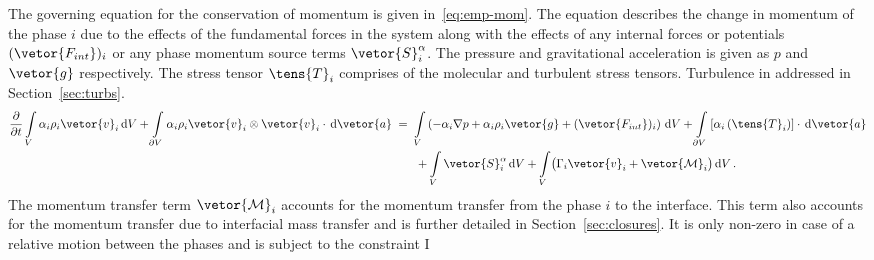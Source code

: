The governing equation for the conservation of momentum is given in~\eqref{eq:emp-mom}.
 The equation describes the change in momentum of the phase $i$ due to the effects of the
 fundamental forces in the system along with the effects of any internal forces or potentials $(\vetor{F_{int}})_{i}$
 or any phase momentum source terms $\vetor{S}_{i}^{\alpha}$. The pressure and gravitational acceleration is given as $p$ and $\vetor{g}$ respectively.
 The stress tensor $\tens{T}_{i}$ comprises of the molecular and turbulent stress tensors. Turbulence
 in addressed in Section~\ref{sec:turbs}.
\begin{equation}\label{eq:emp-mom}
\begin{split}
\frac{\partial}{\partial t}
\int\limits_{V} \alpha_{i} \rho_{i} \vetor{v}_{i} \,\mathrm{d}V
+ \int\limits_{\partial V} \alpha_{i} \rho_{i} \vetor{v}_{i} \otimes \vetor{v}_{i} \cdot\,\mathrm{d}\vetor{a}
&\;=\; 
\int\limits_{V} \left(-\alpha_{i} \nabla p 
+ \alpha_{i} \rho_{i} \vetor{g}
+ (\vetor{F_{int}})_{i} \right) \,\mathrm{d}V
+ \int\limits_{\partial V} \left[ \alpha_{i} \left( \tens{T}_{i}\right) \right] \cdot \,\mathrm{d}\vetor{a} \\
&\qquad {} + \int\limits_{V} \vetor{S}^{\alpha}_{i} \,\mathrm{d}V
+ \int\limits_{V}  \bigl(\Gamma_{i} \vetor{v}_{i} + \vetor{\mathcal{M}}_{i}\bigr)  \,\mathrm{d}V\,.
\end{split}
\end{equation}
The momentum transfer term $\vetor{\mathcal{M}}_{i}$ accounts for the momentum transfer from 
 the phase $i$ to the interface. This term also accounts for the momentum transfer
 due to interfacial mass transfer and is further detailed in Section~\ref{sec:closures}. It is only non-zero in case 
 of a relative motion between the phases and is subject to the constraint
I%

